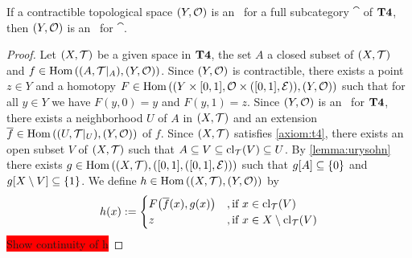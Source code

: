 \begin{theorem}
	If a contractible topological space $\tspace[Y][O]$ is an \ane\ for a full subcategory $\cat$ of  $\mathbf{T4}$, then $\tspace[Y][O]$ is an \aex\ for $\cat$. 
\end{theorem}
\begin{proof}
	Let $\tspace$ be a given space in $\mathbf{T4}$, the set $A$ a closed subset of $\tspace$ and $f \in \Hom\pbraces{\reltspace, \tspace[Y][O]}$. Since $\tspace[Y][O]$ is contractible, there exists a point $z \in Y$ and a homotopy $F \in \Hom\pbraces{\prodtspace[Y][O], \tspace[Y][O]}$ such that for all $y \in Y$ we have $F(y, 0) = y$ and $F(y, 1) = z$. Since $\tspace[Y][O]$ is an \ane\ for $\mathbf{T4}$, there exists a neighborhood $U$ of $A$ in $\tspace$ and an extension $\overline{f} \in \Hom\pbraces{\reltspace[U], \tspace[Y][O]}$ of $f$. Since $\tspace$ satisfies \ref{axiom:t4}, there exists an open subset $V$ of $\tspace$ such that $A \subseteq V \subseteq \mathrm{cl}_\mathcal{T}{\left ( V \right )} \subseteq U$. By \ref{lemma:urysohn} there exists $g \in \Hom\pbraces{\tspace, \pbraces{[0,1], \eucl}}$ such that $g{\left [ A \right ]} \subseteq {\left \{ 0 \right \}}$ and $g{\left [ X \setminus V \right ]} \subseteq {\left \{ 1 \right \}}$. We define $h \in \Hom\pbraces{\tspace, \tspace[Y][O]}$ by 
	\begin{align*}
		h(x) := 
		\begin{cases}
			F{\left ( \overline{f}(x), g(x) \right )} &,\text{if } x \in \mathrm{cl}_\mathcal{T}{\left ( V \right )} \\
			z &,\text{if } x \in X \setminus \mathrm{cl}_\mathcal{T}{\left ( V \right )}
		\end{cases}
	\end{align*}
	\colorbox{red}{Show continuity of h}
\end{proof}

